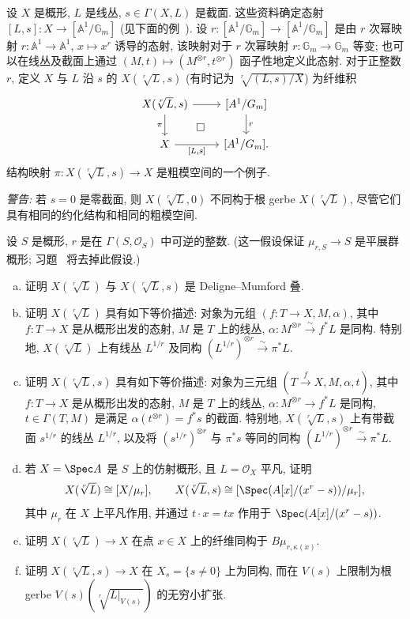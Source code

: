 \begin{example}[根叠]\label{src:4.9.22}
设 $X$ 是概形, $L$ 是线丛, $s\in\Gamma(X,L)$ 是截面. 这些资料确定态射 $[L,s]:X\to[\mathbb A^1/\mathbb G_m]$ (见下面的例~). 设 $r:[\mathbb A^1/\mathbb G_m]\to[\mathbb A^1/\mathbb G_m]$ 是由 $r$ 次幂映射 $r:\mathbb A^1\to\mathbb A^1$, $x\mapsto x^r$ 诱导的态射, 该映射对于 $r$ 次幂映射 $r:\mathbb G_m\to\mathbb G_m$ 等变; 也可以在线丛及截面上通过 $(M,t)\mapsto(M^{\otimes r},t^{\otimes r})$ 函子性地定义此态射. 对于正整数 $r$, 定义 $X$ 与 $L$ 沿 $s$ 的  $X(\sqrt[r]{L},s)$ (有时记为 $\sqrt[r]{(L,s)/X}$) 为纤维积
\[
\begin{tikzcd}
X(\sqrt[r]{L},s)\arrow[r]\arrow[d,"\pi"']&{[\mathbb A^1/\mathbb G_m]}\arrow[d,"r"]\\
X\arrow[r,"{[L,s]}"']\arrow[ur,phantom,"\square" description]&{[\mathbb A^1/\mathbb G_m]}.
\end{tikzcd}
\]
结构映射 $\pi:X(\sqrt[r]{L},s)\to X$ 是粗模空间的一个例子.

\textit{警告:} 若 $s=0$ 是零截面, 则 $X(\sqrt[r]{L},0)$ 不同构于根 gerbe $X(\sqrt[r]{L})$, 尽管它们具有相同的约化结构和相同的粗模空间.
\end{example}
\begin{exercise}\label{src:4.9.23}
设 $S$ 是概形, $r$ 是在 $\Gamma(S,\mathcal O_S)$ 中可逆的整数. (这一假设保证 $\mu_{r,S}\to S$ 是平展群概形; 习题~ 将去掉此假设.)
\begin{enumerate}[(a)]
\item 证明 $X(\sqrt[r]{L})$ 与 $X(\sqrt[r]{L},s)$ 是 Deligne--Mumford 叠.
\item 证明 $X(\sqrt[r]{L})$ 具有如下等价描述: 对象为元组 $(f:T\to X,M,\alpha)$, 其中 $f:T\to X$ 是从概形出发的态射, $M$ 是 $T$ 上的线丛, $\alpha:M^{\otimes r}\xrightarrow{\sim}f^*L$ 是同构. 特别地, $X(\sqrt[r]{L})$ 上有线丛 $L^{1/r}$ 及同构 $(L^{1/r})^{\otimes r}\xrightarrow{\sim}\pi^*L$.
\item 证明 $X(\sqrt[r]{L},s)$ 具有如下等价描述: 对象为三元组 $(T\xrightarrow{f}X,M,\alpha,t)$, 其中 $f:T\to X$ 是从概形出发的态射, $M$ 是 $T$ 上的线丛, $\alpha:M^{\otimes r}\to f^*L$ 是同构, $t\in\Gamma(T,M)$ 是满足 $\alpha(t^{\otimes r})=f^*s$ 的截面. 特别地, $X(\sqrt[r]{L},s)$ 上有带截面 $s^{1/r}$ 的线丛 $L^{1/r}$, 以及将 $(s^{1/r})^{\otimes r}$ 与 $\pi^*s$ 等同的同构 $(L^{1/r})^{\otimes r}\xrightarrow{\sim}\pi^*L$.
\item 若 $X=\Spec A$ 是 $S$ 上的仿射概形, 且 $L=\mathcal O_X$ 平凡, 证明
\[
X(\sqrt[r]{L})\cong[X/\mu_r],\qquad
X(\sqrt[r]{L},s)\cong[\Spec(A[x]/(x^r-s))/\mu_r],
\]
其中 $\mu_r$ 在 $X$ 上平凡作用, 并通过 $t\cdot x=tx$ 作用于 $\Spec(A[x]/(x^r-s))$.
\item 证明 $X(\sqrt[r]{L})\to X$ 在点 $x\in X$ 上的纤维同构于 $B\mu_{r,\kappa(x)}$.
\item 证明 $X(\sqrt[r]{L},s)\to X$ 在 $X_s=\{s\ne0\}$ 上为同构, 而在 $V(s)$ 上限制为根 gerbe $V(s)(\sqrt[r]{L|_{V(s)}})$ 的无穷小扩张.
\end{enumerate}
\end{exercise}

